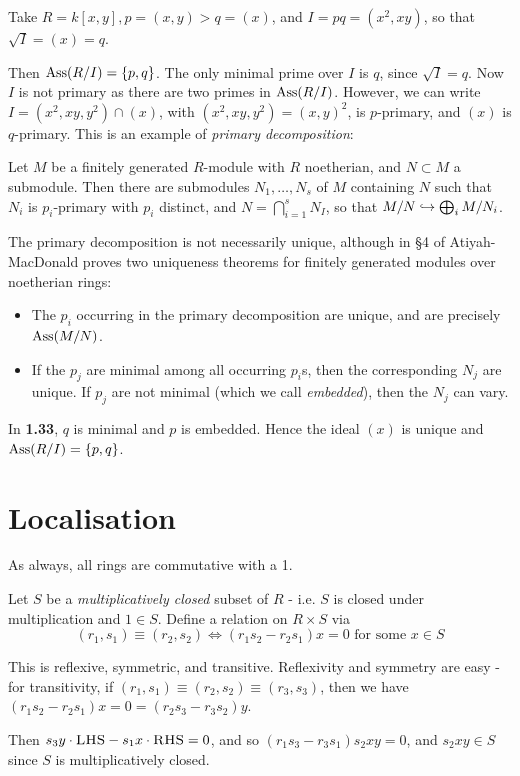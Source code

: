 \documentclass[10pt,a4paper]{article}
\begin{document}
Take $R = k[x,y], p = (x,y) > q = (x)$, and $I = pq = (x^2, xy)$, so that $\sqrt{I} = (x) = q$.

Then $\operatorname{Ass}(R/I) = \{p, q\}$. The only minimal prime over $I$ is $q$, since $\sqrt{I} = q$. Now $I$ is not primary as there are two primes in $\operatorname{Ass}(R/I)$. However, we can write $I = (x^2, xy, y^2) \cap (x)$, with $(x^2, xy, y^2) = (x,y)^2$, is $p$-primary, and $(x)$ is $q$-primary. This is an example of \emph{primary decomposition}:

\begin{definition}
  Let $M$ be a finitely generated $R$-module with $R$ noetherian, and $N \subset M$ a submodule. Then there are submodules $N_1, \ldots, N_s$ of $M$ containing $N$ such that $N_i$ is $p_i$-primary with $p_i$ distinct, and $N = \bigcap\limits_{i=1}^s N_I$, so that $M/N \hookrightarrow \bigoplus_i M/N_i$.
\end{definition}
The primary decomposition is not necessarily unique, although in \S 4 of Atiyah-MacDonald proves two uniqueness theorems for finitely generated modules over noetherian rings:
\begin{itemize}
  \item The $p_i$ occurring in the primary decomposition are unique, and are precisely $\operatorname{Ass}(M/N)$.
  \item If the $p_j$ are minimal among all occurring $p_i$s, then the corresponding $N_j$ are unique. If $p_j$ are not minimal (which we call \emph{embedded}), then the $N_j$ can vary.
\end{itemize}
In \textbf{1.33}, $q$ is minimal and $p$ is embedded. Hence the ideal $(x)$ is unique and \mbox{$\operatorname{Ass}(R/I) = \{p,q\}$}.

\section{Localisation}
As always, all rings are commutative with a 1.

Let $S$ be a \emph{multiplicatively closed} subset of $R$ - i.e. $S$ is closed under multiplication and $1\in S$. Define a relation on $R \times S$ via
\[(r_1, s_1) \equiv (r_2, s_2) \iff (r_1s_2 - r_2s_1)x = 0\text{ for some $x \in S$}\]

This is reflexive, symmetric, and transitive. Reflexivity and symmetry are easy - for transitivity, if $(r_1,s_1)\equiv (r_2,s_2)\equiv (r_3, s_3)$, then we have $(r_1s_2-r_2s_1)x = 0 = (r_2s_3-r_3s_2)y$.

Then $s_3y\cdot\textsc{LHS}-s_1x\cdot\textsc{RHS} = 0$, and so $(r_1s_3-r_3s_1)s_2xy = 0$, and $s_2xy\in S$ since $S$ is multiplicatively closed.
\end{document}
